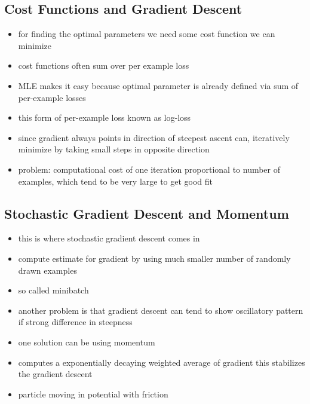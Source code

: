 \documentclass{article}
\begin{document}
\subsection*{Cost Functions and Gradient Descent}
\begin{itemize}
    \item for finding the optimal parameters we need some cost function we can minimize
    \item cost functions often sum over per example loss
    \item MLE makes it easy because optimal parameter is already defined via sum of per-example losses
    \item this form of per-example loss known as log-loss
    \item since gradient always points in direction of steepest ascent can, iteratively minimize by taking small steps in opposite direction
    \item problem: computational cost of one iteration proportional to number of examples, which tend to be very large to get good fit
\end{itemize}

\subsection*{Stochastic Gradient Descent and Momentum}
\begin{itemize}
    \item this is where stochastic gradient descent comes in
    \item compute estimate for gradient by using much smaller number of randomly drawn examples
    \item so called minibatch
    \item another problem is that gradient descent can tend to show oscillatory pattern if strong difference in steepness
    \item one solution can be using momentum
    \item computes a exponentially decaying weighted average of gradient this stabilizes the gradient descent
    \item particle moving in potential with friction
\end{itemize}
\end{document}
